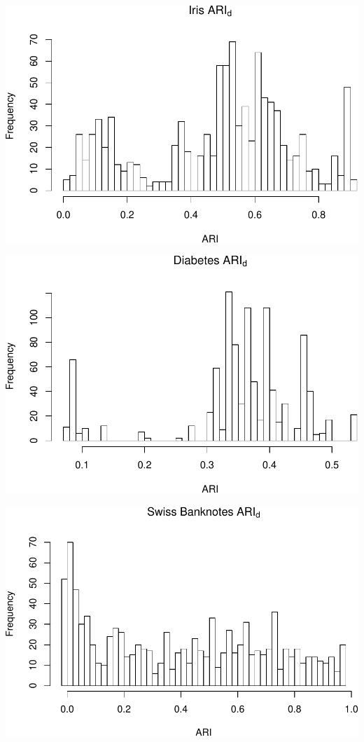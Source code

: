 \documentclass[]{article}
\begin{document}
\begin{center}\includegraphics[width=1\linewidth]{Report_files/figure-latex/unnamed-chunk-15-2} \end{center}

\begin{center}\includegraphics[width=1\linewidth]{Report_files/figure-latex/unnamed-chunk-15-3} \end{center}

\begin{center}\includegraphics[width=1\linewidth]{Report_files/figure-latex/unnamed-chunk-15-4} \end{center}
\end{document}

